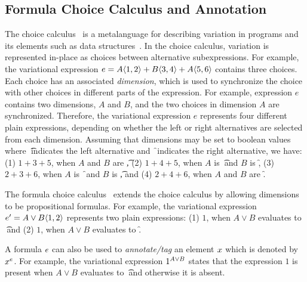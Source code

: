 \subsection{Formula Choice Calculus and Annotation}
\label{sec:fcc}

The choice calculus~\cite{Walk13thesis,EW11tosem} is a metalanguage for
describing variation in programs and its elements such as data 
structures~\cite{Walk14onward,EWC13fosd}.
In the choice calculus, variation is represented in-place as
choices between alternative subexpressions. For example, 
the variational expression 
$e = \chc [A] {1,2} + \chc [B] {3,4} + \chc [A] {5,6}$
 contains three choices.
Each choice has an associated \emph{dimension}, which is used to
synchronize the choice with other choices in different parts
of the expression. For example, expression $e$ contains
two dimensions, $A$ and $B$, and the two choices in dimension
$A$ are synchronized. Therefore, the variational expression
$e$ represents four different plain expressions, depending
on whether the left or right alternatives are selected from each
dimension. Assuming that dimensions may be set to boolean values
where \t\ indicates the left alternative and \f\ indicates the
right alternative, we
have: (1) $1+3+5$, when $A$ and $B$ are \t,
(2) $1+4+5$, when $A$ is \t\ and $B$ is \f,
(3) $2+3+6$, when $A$ is \f\ and $B$ is \t,
and (4) $2+4+6$, when $A$ and $B$ are \f.

%
The formula
choice calculus~\cite{HW16fosd} extends the choice calculus 
by allowing dimensions to be propositional formulas. For example,
the variational expression $e' = \chc [A \vee B] {1,2}$ represents
two plain expressions: (1) $1$, when $A \vee B$ evaluates to \t\
and (2) $1$, when $A \vee B$ evaluates to \f.

%
A formula $\dimMeta$ can also be used to \emph{annotate/tag} an element $\elem$
which is denoted by $\annot \elem$.
For example, the variational expression $\annot [A \vee B] 1$ states that 
the expression $1$ is present when $A \vee B$ evaluates to \t\ and otherwise it is absent. 


